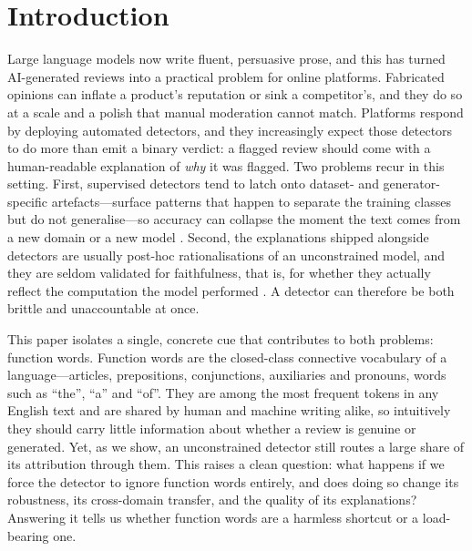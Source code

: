 \documentclass[10pt,twocolumn]{article}
\begin{document}
\section{Introduction}
Large language models now write fluent, persuasive prose, and this has turned AI-generated reviews into a practical problem for online platforms. Fabricated opinions can inflate a product's reputation or sink a competitor's, and they do so at a scale and a polish that manual moderation cannot match. Platforms respond by deploying automated detectors, and they increasingly expect those detectors to do more than emit a binary verdict: a flagged review should come with a human-readable explanation of \emph{why} it was flagged. Two problems recur in this setting. First, supervised detectors tend to latch onto dataset- and generator-specific artefacts---surface patterns that happen to separate the training classes but do not generalise---so accuracy can collapse the moment the text comes from a new domain or a new model \cite{raid,sadasivan}. Second, the explanations shipped alongside detectors are usually post-hoc rationalisations of an unconstrained model, and they are seldom validated for faithfulness, that is, for whether they actually reflect the computation the model performed \cite{jacovi}. A detector can therefore be both brittle and unaccountable at once.

This paper isolates a single, concrete cue that contributes to both problems: function words. Function words are the closed-class connective vocabulary of a language---articles, prepositions, conjunctions, auxiliaries and pronouns, words such as ``the'', ``a'' and ``of''. They are among the most frequent tokens in any English text and are shared by human and machine writing alike, so intuitively they should carry little information about whether a review is genuine or generated. Yet, as we show, an unconstrained detector still routes a large share of its attribution through them. This raises a clean question: what happens if we force the detector to ignore function words entirely, and does doing so change its robustness, its cross-domain transfer, and the quality of its explanations? Answering it tells us whether function words are a harmless shortcut or a load-bearing one.
\end{document}
